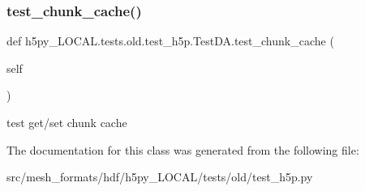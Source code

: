\subsubsection{\texorpdfstring{test\+\_\+chunk\+\_\+cache()}{test\_chunk\_cache()}}
{\footnotesize\ttfamily def h5py\+\_\+\+L\+O\+C\+A\+L.\+tests.\+old.\+test\+\_\+h5p.\+Test\+D\+A.\+test\+\_\+chunk\+\_\+cache (\begin{DoxyParamCaption}\item[{}]{self }\end{DoxyParamCaption})}

\begin{DoxyVerb}test get/set chunk cache \end{DoxyVerb}
 

The documentation for this class was generated from the following file\+:\begin{DoxyCompactItemize}
\item 
src/mesh\+\_\+formats/hdf/h5py\+\_\+\+L\+O\+C\+A\+L/tests/old/test\+\_\+h5p.\+py\end{DoxyCompactItemize}

